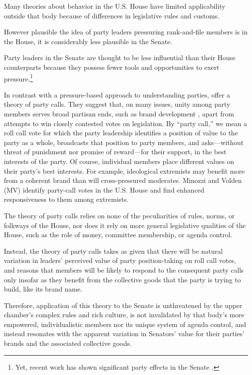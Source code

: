 \documentclass[12pt]{article}
\begin{document}
Many theories about behavior in the U.S. House have limited applicability
outside that body because of differences in legislative rules and customs.

However plausible the idea of party leaders pressuring rank-and-file members is
in the House, it is considerably less plausible in the Senate.

Party leaders in the Senate
are thought to be less influential than their House counterparts because they
possess fewer tools and opportunities to exert pressure.\footnote{
  \doublespacing\normalsize Yet, recent work has shown significant party
  effects in the Senate \citep[e.g.,][]{Gailmard:2007, Monroe:2008,
  Patty:2008, Volden:2006}.}



In contrast with a pressure-based approach to understanding parties,
\cite{Minozzi:2013} offer a theory of party calls.
They suggest that, on many issues, unity among party members
serves broad partisan ends, such as brand development
\citep[e.g.,][]{Snyder:2002}, apart from attempts to win closely contested
votes on legislation.
By ``party call,'' we mean a roll call vote for
which the party leadership identifies a position of value to the party as a
whole, broadcasts that position to party members, and
asks---without threat of punishment nor promise of reward---for
their support, in the best interests of the party.
Of course, individual members place different values on their party's best
interests.
For example, ideological extremists may benefit more from a coherent brand
than will cross-pressured moderates.
Minozzi and Volden (MV) identify party-call votes in the U.S. House and find
enhanced responsiveness to them among extremists.





The theory of party calls relies on none of the peculiarities of rules,
norms, or folkways of the House, nor does it rely on more general
legislative qualities of the House, such as the role of money, committee
membership, or agenda control.

Instead, the theory of party calls takes as given that there will be natural
variation in leaders' perceived value of party position-taking on roll call
votes, and reasons that members will be likely to respond to the consequent
party calls only insofar as they benefit from the collective goods that the
party is trying to build, like its brand name.

Therefore, application of this theory to the Senate
is unthreatened by the upper chamber's complex rules and rich culture,
is not invalidated by that body's more empowered, individualistic members
nor its unique system of agenda control,
and instead resonates with the apparent variation in Senators' value for
their parties' brands and the associated collective goods.
\end{document}
